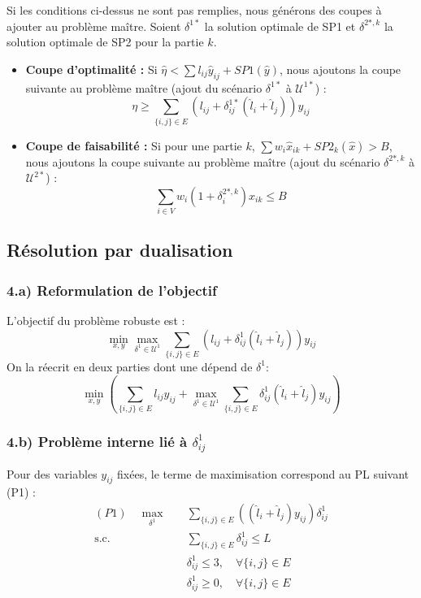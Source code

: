 \documentclass{article}
\begin{document}
Si les conditions ci-dessus ne sont pas remplies, nous générons des coupes à ajouter au problème maître. Soient $\delta^{1*}$ la solution optimale de SP1 et $\delta^{2*, k}$ la solution optimale de SP2 pour la partie $k$.

\begin{itemize}
    \item \textbf{Coupe d'optimalité :} Si $\hat{\eta} < \sum l_{ij} \hat{y}_{ij} + SP1(\hat{y})$, nous ajoutons la coupe suivante au problème maître (ajout du scénario $\delta^{1*}$ à $\mathcal{U}^{1*}$) :
    \[
    \eta \ge \sum_{\{i,j\} \in E} \left( l_{ij} + \delta_{ij}^{1*} (\hat{l}_i + \hat{l}_j) \right) y_{ij}
    \]
    
    \item \textbf{Coupe de faisabilité :} Si pour une partie $k$, $\sum w_i \hat{x}_{ik} + SP2_k(\hat{x}) > B$, nous ajoutons la coupe suivante au problème maître (ajout du scénario $\delta^{2*, k}$ à $\mathcal{U}^{2*}$) :
    \[
    \sum_{i \in V} w_i (1 + \delta_{i}^{2*, k}) x_{ik} \le B
    \]
\end{itemize}

\subsection{Résolution par dualisation}

\subsubsection*{4.a) Reformulation de l'objectif}
L'objectif du problème robuste est :
\[
\min_{x,y} \max_{\delta^1 \in \mathcal{U}^1} \sum_{\{i,j\} \in E} (l_{ij} + \delta_{ij}^1 (\hat{l}_i + \hat{l}_j)) y_{ij}
\]
On la réecrit en deux parties dont une dépend de $\delta^1$:
\[
\min_{x,y} \left( \sum_{\{i,j\} \in E} l_{ij} y_{ij} + \max_{\delta^1 \in \mathcal{U}^1} \sum_{\{i,j\} \in E} \delta_{ij}^1 (\hat{l}_i + \hat{l}_j) y_{ij} \right)
\]

\subsubsection*{4.b) Problème interne lié à $\delta_{ij}^1$}
Pour des variables $y_{ij}$ fixées, le terme de maximisation correspond au PL suivant (P1) :
\begin{align*}
    (P1) \quad \max_{\delta^1} \quad & \sum_{\{i,j\} \in E} \left( (\hat{l}_i + \hat{l}_j) y_{ij} \right) \delta_{ij}^1 \\
    \text{s.c.} \quad & \sum_{\{i,j\} \in E} \delta_{ij}^1 \le L \\
    & \delta_{ij}^1 \le 3, \quad \forall \{i,j\} \in E \\
    & \delta_{ij}^1 \ge 0, \quad \forall \{i,j\} \in E
\end{align*}
\end{document}
